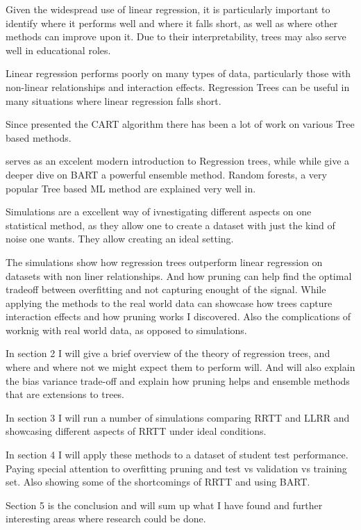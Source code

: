 \documentclass[12pt]{article}
\begin{document}
Given the widespread use of linear regression, it is particularly important to identify where it performs well and where it falls short, as well as where other methods can improve upon it. Due to their interpretability, trees may also serve well in educational roles.

Linear regression performs poorly on many types of data, particularly those with non-linear relationships and interaction effects. Regression Trees can be useful in many situations where linear regression falls short.

Since \citep{breiman1984} presented the CART algorithm there has been a lot of work on various Tree based methods.

\citep{hastie2021} serves as an excelent modern introduction to Regression trees, while while \citep{tan2019} give a deeper dive on BART a powerful ensemble method.
Random forests, a very popular Tree based ML method are explained very well in\citep{biau2016}.

Simulations are a excellent way of ivnestigating different aspects on one statistical method, as they allow one to create a dataset with just the kind of noise one wants. They allow creating an ideal setting.

The simulations show how regression trees outperform linear regression on datasets with non liner relationships. And how pruning can help find the optimal tradeoff between overfitting and not capturing enought of the signal. While applying the methods to the real world data can showcase how trees capture  interaction effects and how pruning works I discovered. Also the complications of worknig with real world data, as opposed to simulations.


In section 2 I will give a brief overview of the theory of regression trees, and where and where not we might expect them to perform will. And will also explain the bias variance trade-off and explain how pruning helps and ensemble methods that are extensions to trees.

In section 3 I will run a number of simulations comparing RRTT and LLRR and showcasing different aspects of RRTT under ideal conditions.

In section 4 I will apply these methods to a dataset of student test performance. Paying special attention to overfitting pruning and test vs validation vs training set. Also showing some of the shortcomings of RRTT and using BART.

Section 5 is the conclusion and will sum up what I have found and further interesting areas where research could be done.
\end{document}

